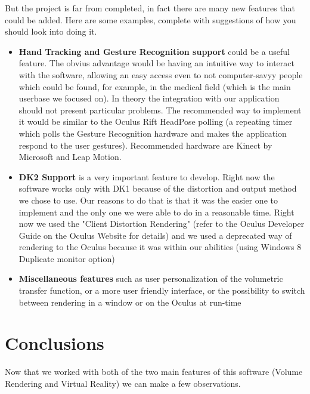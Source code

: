 \documentclass[11pt]{article} %
\begin{document}
But the project is far from completed, in fact there are many new features that could be added. Here are some examples, complete with suggestions of how you should look into doing it.
\begin{itemize}
\item \textbf{Hand Tracking and Gesture Recognition support} could be a useful feature. The obvius advantage would be having an intuitive way to interact with the software, allowing an easy access even to not computer-savyy people which could be found, for example, in the medical field (which is the main userbase we focused on). In theory the integration with our application should not present particular problems. The recommended way to implement it would be similar to the Oculus Rift HeadPose polling (a repeating timer which polls the Gesture Recognition hardware and makes the application respond to the user gestures). Recommended hardware are Kinect by Microsoft and Leap Motion.
\item \textbf{DK2 Support} is a very important feature to develop. Right now the software works only with DK1 because of the distortion and output method we chose to use. Our reasons to do that is that it was the easier one to implement and the only one we were able to do in a reasonable time. Right now we used the "Client Distortion Rendering" (refer to the Oculus Developer Guide on the Oculus Website for details) and we used a deprecated way of rendering to the Oculus because it was within our abilities (using Windows 8 Duplicate monitor option)
\item \textbf{Miscellaneous features} such as user personalization of the volumetric transfer function, or a more user friendly interface, or the possibility to switch between rendering in a window or on the Oculus  at run-time
\end{itemize}
\newpage

\section{Conclusions}
Now that we worked with both of the two main features of this software (Volume Rendering and Virtual Reality) we can make a few observations.
\end{document}

